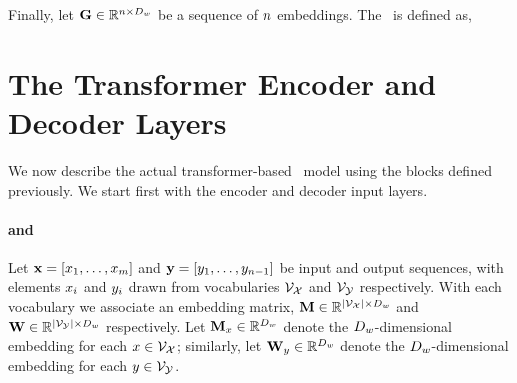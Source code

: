            \noindent Finally, let $\mathbf{G} \in \mathbb{R}^{n \times D_{w}}$ be a sequence of $n$ embeddings. The \encoderattentionblock~is
           defined as,\\



\section{The Transformer Encoder and Decoder Layers}

We now describe the actual transformer-based \sequencetosequence~model
using the blocks defined previously. We start first with the encoder 
and decoder input layers.


\paragraph{ and }
           Let $\mathbf{x} = \left[ x_1,\ldots,x_{m}\right]$ and 
           $\mathbf{y} = \left[y_1,\ldots,y_{n-1}\right]$ be 
           input and output sequences, with elements $x_i$ and $y_i$
           drawn from vocabularies $\mathcal{V}_{\mathcal{X}}$ and $\mathcal{V}_{\mathcal{Y}}$ respectively.
           With each vocabulary we associate an embedding matrix,
          $\mathbf{M} \in \mathbb{R}^{{\left\vert \mathcal{V}_{\mathcal{X}} \right\vert} \times D_{w}}$ 
          and 
          $\mathbf{W} \in \mathbb{R}^{{\left\vert \mathcal{V}_{\mathcal{Y}} \right\vert} \times D_{w}}$ 
          respectively. Let $\mathbf{M}_{x} \in \mathbb{R}^{D_{w}}$ denote the $D_{w}$-dimensional  embedding for each $x \in \mathcal{V}_{\mathcal{X}}$; similarly,  
let $\mathbf{W}_y \in \mathbb{R}^{D_{w}}$ denote the $D_{w}$-dimensional  embedding for each $y \in \mathcal{V}_{\mathcal{Y}}$.

